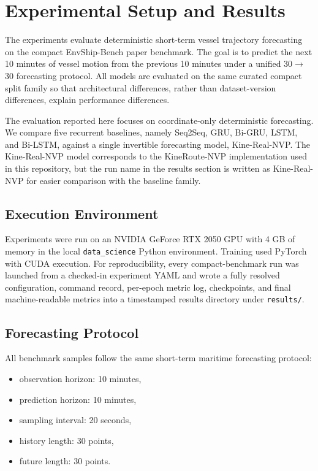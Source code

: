 \documentclass[conference]{IEEEtran}
\begin{document}
\section{Experimental Setup and Results}
\label{sec:experimental_setup_results}

The experiments evaluate deterministic short-term vessel trajectory forecasting on the compact EnvShip-Bench paper benchmark. The goal is to predict the next 10 minutes of vessel motion from the previous 10 minutes under a unified 30$\rightarrow$30 forecasting protocol. All models are evaluated on the same curated compact split family so that architectural differences, rather than dataset-version differences, explain performance differences.

The evaluation reported here focuses on coordinate-only deterministic forecasting. We compare five recurrent baselines, namely Seq2Seq, GRU, Bi-GRU, LSTM, and Bi-LSTM, against a single invertible forecasting model, Kine-Real-NVP. The Kine-Real-NVP model corresponds to the KineRoute-NVP implementation used in this repository, but the run name in the results section is written as Kine-Real-NVP for easier comparison with the baseline family.

\subsection{Execution Environment}
\label{subsec:execution_environment}

Experiments were run on an NVIDIA GeForce RTX 2050 GPU with 4 GB of memory in the local \texttt{data\_science} Python environment. Training used PyTorch with CUDA execution. For reproducibility, every compact-benchmark run was launched from a checked-in experiment YAML and wrote a fully resolved configuration, command record, per-epoch metric log, checkpoints, and final machine-readable metrics into a timestamped results directory under \texttt{results/}.

\subsection{Forecasting Protocol}
\label{subsec:forecasting_protocol}

All benchmark samples follow the same short-term maritime forecasting protocol:
\begin{itemize}
\item observation horizon: 10 minutes,
\item prediction horizon: 10 minutes,
\item sampling interval: 20 seconds,
\item history length: 30 points,
\item future length: 30 points.
\end{itemize}
\end{document}
